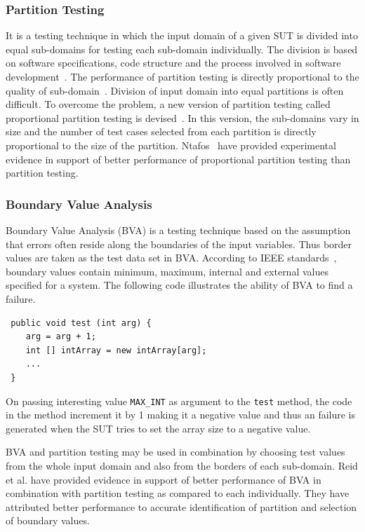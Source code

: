 \subsubsection{Partition Testing}
It is a testing technique in which the input domain of a given SUT is divided into equal sub-domains for testing each sub-domain individually. The division is based on software specifications, code structure and the process involved in software development~\cite{hamlet1990partition}. The performance of partition testing is directly proportional to the quality of sub-domain~\cite{weyuker1991analyzing}. Division of input domain into equal partitions is often difficult. To overcome the problem, a new version of partition testing called proportional partition testing is devised~\cite{chan1996proportional}. In this version, the sub-domains vary in size and the number of test cases selected from each partition is directly proportional to the size of the partition. Ntafos~\cite{ntafos1998random} have provided experimental evidence in support of better performance of proportional partition testing than partition testing.


\subsubsection{Boundary Value Analysis}
Boundary Value Analysis (BVA) is a testing technique based on the assumption that errors often reside along the boundaries of the input variables. Thus border values are taken as the test data set in BVA. According to IEEE standards~\cite{radatz1990ieee}, boundary values contain minimum, maximum, internal and external values specified for a system.
The following code illustrates the ability of BVA to find a failure. 
\bigskip
\bigskip
\begin{lstlisting}
 public void test (int arg) {
	arg = arg + 1;
	int [] intArray = new intArray[arg];
	...
 }
\end{lstlisting}
\bigskip
On passing interesting value \verb+MAX_INT+ as argument to the \verb+test+ method, the code in the method increment it by 1 making it a negative value and thus an failure is generated when the SUT tries to set the array size to a negative value.

BVA and partition testing may be used in combination by choosing test values from the whole input domain and also from the borders of each sub-domain. Reid et al. \cite{reid1997empirical} have provided evidence in support of better performance of BVA in combination with partition testing as compared to each individually. They have attributed better performance to accurate identification of partition and selection of boundary values. 


